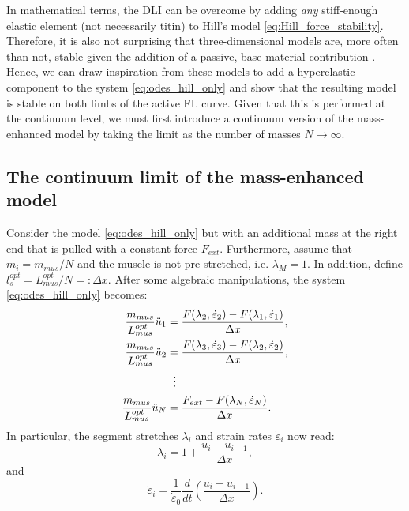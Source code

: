 \documentclass{sfuthesis}
\numberwithin{equation}{section}
\numberwithin{figure}{chapter}
\numberwithin{table}{chapter}
\theoremstyle{definition}
\newcommand{\depsilon}{\dot{\varepsilon}}
\begin{document}
In mathematical terms, the DLI can be overcome by adding \textit{any} stiff-enough elastic element (not necessarily titin) to Hill's model \eqref{eq:Hill_force_stability}. Therefore, it is also not surprising that three-dimensional models are, more often than not, stable given the addition of a passive, base material contribution \cite{AlmonacidEtAl2022_SIAP_Paper}. Hence, we can draw inspiration from these models to add a hyperelastic component to the system \eqref{eq:odes_hill_only} and show that the resulting model is stable on both limbs of the active FL curve. Given that this is performed at the continuum level, we must first introduce a continuum version of the mass-enhanced model by taking the limit as the number of masses $N \to \infty$.

\subsection{The continuum limit of the mass-enhanced model}

Consider the model \eqref{eq:odes_hill_only} but with an additional mass at the right end that is pulled with a constant force $F_{ext}$. Furthermore, assume that $m_i = m_{mus}/N$ and the muscle is not pre-stretched, i.e. $\lambda_M = 1$. In addition, define $l_s^{opt} = L_{mus}^{opt}/N =: \Delta x$. After some algebraic manipulations, the system \eqref{eq:odes_hill_only} becomes:
\begin{subequations} \label{eq:continuum_model_1}
    \begin{align}
        \dfrac{m_{mus}}{L_{mus}^{opt}} \ddot{u}_1 &= \dfrac{F(\lambda_2, \depsilon_2) - F(\lambda_1, \depsilon_1)}{\Delta x}, \\
        \dfrac{m_{mus}}{L_{mus}^{opt}} \ddot{u}_2 &= \dfrac{F(\lambda_3,\depsilon_3) - F(\lambda_2,\depsilon_2)}{\Delta x}, \\
        &\hspace{0.6em} \vdots \notag \\
        \dfrac{m_{mus}}{L_{mus}^{opt}} \ddot{u}_{N} &= \dfrac{F_{ext} - F(\lambda_{N}, \depsilon_{N})}{\Delta x}.
    \end{align}
\end{subequations}
In particular, the segment stretches $\lambda_i$ and strain rates $\depsilon_i$ now read:
\begin{equation} \label{eq:continuum_model_2}
    \lambda_i = 1 + \dfrac{u_i-u_{i-1}}{\Delta x},
\end{equation}
and
\begin{equation} \label{eq:continuum_model_3}
    \depsilon_i = \dfrac{1}{\depsilon_0} \dfrac{d}{dt} \left( \dfrac{u_i-u_{i-1}}{\Delta x} \right).
\end{equation}
\end{document}
